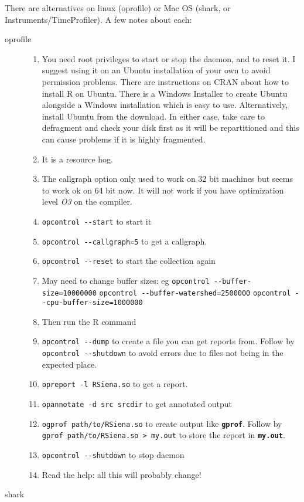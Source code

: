 \documentclass[12pt, a4paper]{article}
\renewcommand{\=}{\,=\,}
\newcommand{\+}{\,+\,}
\newcommand{\sfn}[1]{\textbf{\texttt{#1}}}
\begin{document}
There are alternatives on linux (\textsf{oprofile}) or Mac OS (\textsf{shark},
or
\textsf{Instruments/TimeProfiler}).
A few notes about each:
\begin{description}
\item[oprofile]
\begin{enumerate}
\item You need root privileges to start or stop the daemon, and to reset it. I
  suggest using it on an Ubuntu installation of your own to avoid permission
  problems. There are instructions on CRAN about how to install R on
  Ubuntu. There is a Windows Installer to create Ubuntu alongside a Windows
  installation which is easy to use. Alternatively, install Ubuntu from the
  download. In either case, take care to defragment and check your disk first as
  it will be repartitioned and this can cause problems if it is highly
  fragmented.
\item It is a resource hog.
\item The callgraph option only used to work on 32 bit machines but seems to
  work ok on 64 bit now. It will not work if you have optimization level
  \emph{O3} on the compiler.
\item \verb|opcontrol --start| to start it
\item \verb|opcontrol --callgraph=5| to get a callgraph.
\item \verb|opcontrol --reset| to start the collection again
\item May need to change buffer sizes: eg
\verb|opcontrol --buffer-size=10000000|
\verb|opcontrol --buffer-watershed=2500000|
\verb|opcontrol --cpu-buffer-size=1000000|
\item Then run the R command
\item \verb|opcontrol --dump| to create a file you can get reports from.
Follow by \verb|opcontrol --shutdown| to avoid errors due to files not being in
the expected place.
\item \verb|opreport -l RSiena.so| to get a report.
\item \verb|opannotate -d src srcdir| to get annotated output
\item \verb|ogprof path/to/RSiena.so| to create output like \sfn{gprof}.
Follow by
\verb|gprof path/to/RSiena.so > my.out| to store the report in \sfn{my.out}.
\item \verb|opcontrol --shutdown| to stop daemon
\item Read the help: all this will probably change!
\end{enumerate}
\item[shark]

\end{description}
\end{document}

